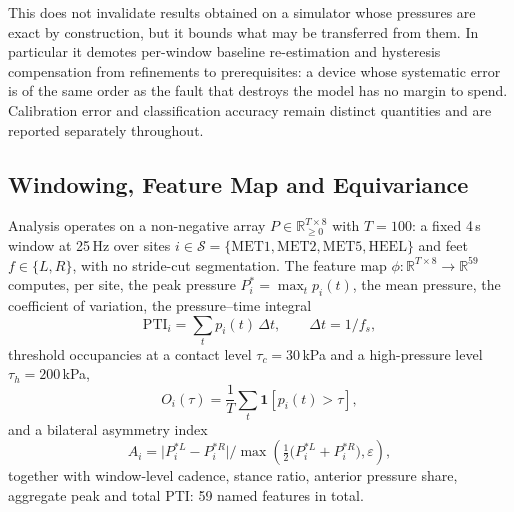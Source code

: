 \documentclass[10pt,conference,a4paper]{IEEEtran}
\begin{document}
This does not invalidate results obtained on a simulator whose pressures are
exact by construction, but it bounds what may be transferred from them. In
particular it demotes per-window baseline re-estimation and hysteresis
compensation from refinements to prerequisites: a device whose systematic error
is of the same order as the fault that destroys the model has no margin to
spend. Calibration error and classification accuracy remain distinct
quantities and are reported separately throughout.

\subsection{Windowing, Feature Map and Equivariance}
\label{sec:feat}

Analysis operates on a non-negative array
$P\in\mathbb{R}_{\ge0}^{T\times 8}$ with $T=100$: a fixed 4\,s window at
25\,Hz over sites $i\in\mathcal{S}=\{\mathrm{MET1},\mathrm{MET2},
\mathrm{MET5},\mathrm{HEEL}\}$ and feet $f\in\{L,R\}$, with no stride-cut
segmentation. The feature map $\phi:\mathbb{R}^{T\times8}\to\mathbb{R}^{59}$
computes, per site, the peak pressure $P^{\ast}_i=\max_t p_i(t)$, the mean
pressure, the coefficient of variation, the pressure--time integral
\begin{equation}
\mathrm{PTI}_i = \sum_{t} p_i(t)\,\Delta t, \qquad \Delta t = 1/f_s,
\label{eq:pti}
\end{equation}
threshold occupancies at a contact level $\tau_c=30$\,kPa and a high-pressure
level $\tau_h=200$\,kPa,
\begin{equation}
O_i(\tau) = \frac{1}{T}\sum_{t} \mathbf{1}\!\left[p_i(t)>\tau\right],
\label{eq:occ}
\end{equation}
and a bilateral asymmetry index
\begin{equation}
A_i = \bigl|P_i^{\ast L}-P_i^{\ast R}\bigr| \big/
      \max\!\left(\tfrac{1}{2}\bigl(P_i^{\ast L}+P_i^{\ast R}\bigr),\varepsilon\right),
\label{eq:asym}
\end{equation}
together with window-level cadence, stance ratio, anterior pressure share,
aggregate peak and total PTI: 59 named features in total.
\end{document}
